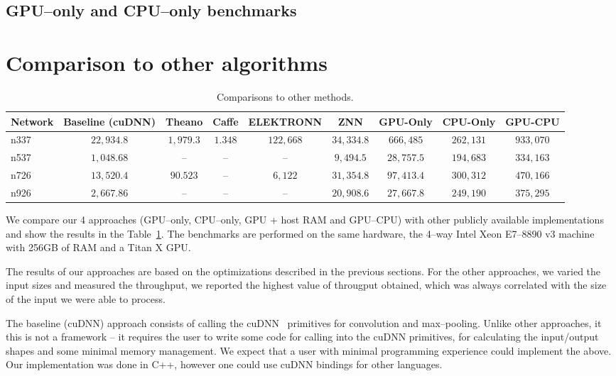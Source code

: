 \documentclass[conference]{./IEEEtran/IEEEtran}
\begin{document}
\subsection{GPU--only and CPU--only benchmarks}



\section{Comparison to other algorithms}


  \begin{table}[h!tbp]
    \centering
    \begin{tabular}{l|cccccccc}
      \toprule
      Network  & Baseline (cuDNN)  & Theano      & Caffe    & ELEKTRONN   & ZNN         & GPU-Only    & CPU-Only    & GPU-CPU   \\
      \midrule
      n337     & $22,934.8$        & $1,979.3$   & $1.348$  & $122,668$   & $34,334.8$  & $666,485$   & $262,131$   & $933,070$ \\
      n537     & $1,048.68$        & --          & --       & --          & $9,494.5$   & $28,757.5$  & $194,683$   & $334,163$ \\
      n726     & $13,520.4$        & $90.523$    & --       & $6,122$     & $31,354.8$  & $97,413.4$  & $300,312$   & $470,166$ \\
      n926     & $2,667.86$        & --          & --       & --          & $20,908.6$  & $27,667.8$  & $249,190$   & $375,295$ \\
      \bottomrule
    \end{tabular}
    \caption{Comparisons to other methods.}
    \label{table:comparisons_to_others}
  \end{table}

  We compare our 4 approaches (GPU--only, CPU--only, GPU + host RAM
  and GPU--CPU) with other publicly available implementations and show
  the results in the Table~\ref{table:comparisons_to_others}.  The
  benchmarks are performed on the same hardware, the 4--way Intel Xeon
  E7–8890 v3 machine with 256GB of RAM and a Titan X GPU.

  The results of our approaches are based on the optimizations
  described in the previous sections.  For the other approaches, we
  varied the input sizes and measured the throughput, we reported the
  highest value of througput obtained, which was always correlated
  with the size of the input we were able to process.

  The baseline (cuDNN) approach consists of calling the
  cuDNN~\cite{chetlur2014cudnn} primitives for convolution and
  max--pooling.  Unlike other approaches, it this is not a framework
  -- it requires the user to write some code for calling into the
  cuDNN primitives, for calculating the input/output shapes and some
  minimal memory management.  We expect that a user with minimal
  programming experience could implement the above.  Our
  implementation was done in C++, however one could use cuDNN bindings
  for other languages.
\end{document}
